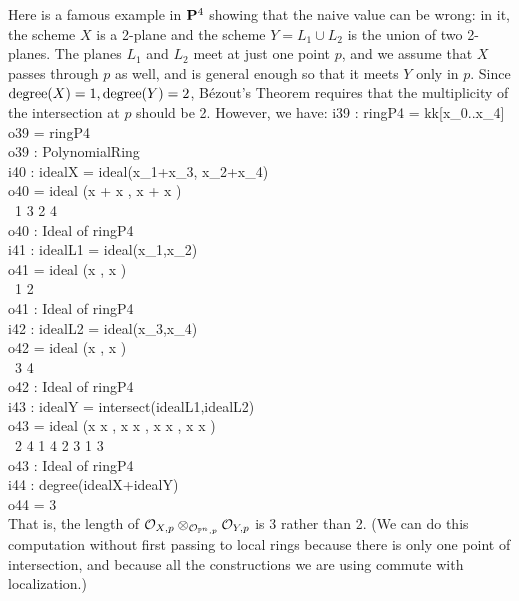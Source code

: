 Here is a famous example in ${\bf P}^4$ showing that
the naive value can be wrong: in it, the scheme $X$ is a 2-plane
and the scheme $Y=L_1\cup L_2$ is the union of two 2-planes. 
The planes $L_1$ and $L_2$ meet at just one point $p$,
and we assume that $X$ passes through $p$ as well, and
is general enough so that it meets
$Y$ only in $p$.
Since $\mathop{\rm degree}(X) = 1, \mathop{\rm degree}(Y) = 2$, 
B\'ezout's Theorem requires that
the multiplicity of the intersection at $p$ should be 2. 
However, we have:
\beginOutput
i39 : ringP4 = kk[x_0..x_4]\\
\emptyLine
o39 = ringP4\\
\emptyLine
o39 : PolynomialRing\\
\endOutput
\beginOutput
i40 : idealX = ideal(x_1+x_3, x_2+x_4)\\
\emptyLine
o40 = ideal (x  + x , x  + x )\\
\              1    3   2    4\\
\emptyLine
o40 : Ideal of ringP4\\
\endOutput
\beginOutput
i41 : idealL1 = ideal(x_1,x_2)\\
\emptyLine
o41 = ideal (x , x )\\
\              1   2\\
\emptyLine
o41 : Ideal of ringP4\\
\endOutput
\beginOutput
i42 : idealL2 = ideal(x_3,x_4)\\
\emptyLine
o42 = ideal (x , x )\\
\              3   4\\
\emptyLine
o42 : Ideal of ringP4\\
\endOutput
\beginOutput
i43 : idealY = intersect(idealL1,idealL2)\\
\emptyLine
o43 = ideal (x x , x x , x x , x x )\\
\              2 4   1 4   2 3   1 3\\
\emptyLine
o43 : Ideal of ringP4\\
\endOutput
\beginOutput
i44 : degree(idealX+idealY)\\
\emptyLine
o44 = 3\\
\endOutput
That is, 
the length of 
${\cal O}_{X,p}\otimes_{{\cal O}_{{\mathbb P}^n,p}} {\cal O}_{Y,p}$
is 3 rather than 2. (We can do this computation
without first passing to local rings because there
is only one point of intersection, and because all the
constructions we are using commute with localization.)

